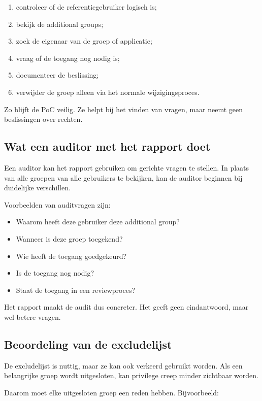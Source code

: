 \begin{enumerate}
	\item controleer of de referentiegebruiker logisch is;
	\item bekijk de additional groups;
	\item zoek de eigenaar van de groep of applicatie;
	\item vraag of de toegang nog nodig is;
	\item documenteer de beslissing;
	\item verwijder de groep alleen via het normale wijzigingsproces.
\end{enumerate}

Zo blijft de PoC veilig. Ze helpt bij het vinden van vragen, maar neemt geen beslissingen over rechten.

\subsection*{Wat een auditor met het rapport doet}

Een auditor kan het rapport gebruiken om gerichte vragen te stellen. In plaats van alle groepen van alle gebruikers te bekijken, kan de auditor beginnen bij duidelijke verschillen.

Voorbeelden van auditvragen zijn:

\begin{itemize}
	\item Waarom heeft deze gebruiker deze additional group?
	\item Wanneer is deze groep toegekend?
	\item Wie heeft de toegang goedgekeurd?
	\item Is de toegang nog nodig?
	\item Staat de toegang in een reviewproces?
\end{itemize}

Het rapport maakt de audit dus concreter. Het geeft geen eindantwoord, maar wel betere vragen.

\subsection*{Beoordeling van de excludelijst}

De excludelijst is nuttig, maar ze kan ook verkeerd gebruikt worden. Als een belangrijke groep wordt uitgesloten, kan privilege creep minder zichtbaar worden.

Daarom moet elke uitgesloten groep een reden hebben. Bijvoorbeeld:

